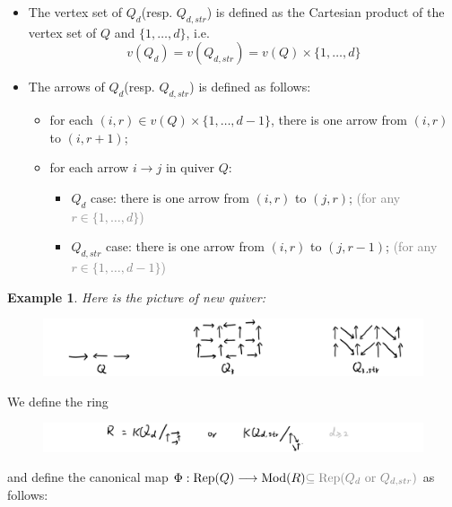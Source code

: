 \documentclass[reqno,11pt]{amsart}
\numberwithin{equation}{section}
\theoremstyle{plain}
\newtheorem{eg}[theorem]{Example}
\theoremstyle{plain}
\numberwithin{equation}{section}
\theoremstyle{remark}
\DeclareMathOperator{\Rep}{\operatorname{Rep}}
\DeclareMathOperator{\Mod}{\operatorname{Mod}}
\begin{document}
\begin{itemize}
	\item The vertex set of $Q_d$(resp. $Q_{d,str}$) is defined as the Cartesian product of the vertex set of $Q$ and $\{1,\ldots,d\}$, i.e.
	$$v(Q_d)=v(Q_{d,str})=v(Q) \times \{1,\ldots,d\}$$
	\item  The arrows of $Q_d$(resp. $Q_{d,str}$) is defined as follows:
	\begin{itemize}
		\item for each $(i,r) \in v(Q) \times \{1,\ldots,d-1\}$, there is one arrow from $(i,r)$ to $(i,r+1)$;
		\item for each arrow $i \longrightarrow j$ in quiver $Q$:
		\begin{itemize}
			\item $Q_d$ case: there is one arrow from $(i,r)$ to $(j,r)$; \textcolor{gray}{(for any $r \in \{1,\ldots,d\}$)}
			\item $Q_{d,str}$ case: there is one arrow from $(i,r)$ to $(j,r-1)$; \textcolor{gray}{(for any $r \in \{1,\ldots,d-1\}$)}			
		\end{itemize}
	\end{itemize}
\end{itemize}
\begin{eg}
Here is the picture of new quiver:
\begin{center}
	\begin{figure}[ht]
		\vspace{0cm}
		\centering
		\includegraphics[width=15cm]{figures/newquiver.png}
		\caption{}
		\label{fig:newquiver}
	\end{figure}
\end{center}
\end{eg}
We define the ring 
\begin{center}
	\begin{figure}[ht]\label{fig:newring}
		\vspace{0cm}
		\centering
		\includegraphics[width=15cm]{figures/newring.png}
	\end{figure}
\end{center}
and define the canonical map $\Phi:\Rep(Q) \longrightarrow \Mod(R) \textcolor{gray}{\subseteq \Rep(Q_d \text{ or } Q_{d,str})}$ as follows:
\end{document}
